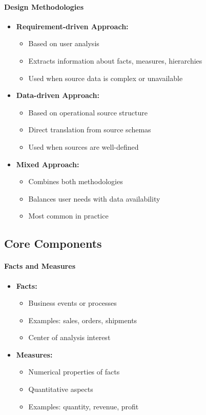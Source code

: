 \documentclass[a4paper,11pt]{article}
\begin{document}
\paragraph{Design Methodologies}
\begin{itemize}
    \item \textbf{Requirement-driven Approach:}
        \begin{itemize}
            \item Based on user analysis
            \item Extracts information about facts, measures, hierarchies
            \item Used when source data is complex or unavailable
        \end{itemize}
    \item \textbf{Data-driven Approach:}
        \begin{itemize}
            \item Based on operational source structure
            \item Direct translation from source schemas
            \item Used when sources are well-defined
        \end{itemize}
    \item \textbf{Mixed Approach:}
        \begin{itemize}
            \item Combines both methodologies
            \item Balances user needs with data availability
            \item Most common in practice
        \end{itemize}
\end{itemize}

\subsection{Core Components}

\paragraph{Facts and Measures}
\begin{itemize}
    \item \textbf{Facts:}
        \begin{itemize}
            \item Business events or processes
            \item Examples: sales, orders, shipments
            \item Center of analysis interest
        \end{itemize}
    \item \textbf{Measures:}
        \begin{itemize}
            \item Numerical properties of facts
            \item Quantitative aspects
            \item Examples: quantity, revenue, profit
        \end{itemize}
\end{itemize}
\end{document}
